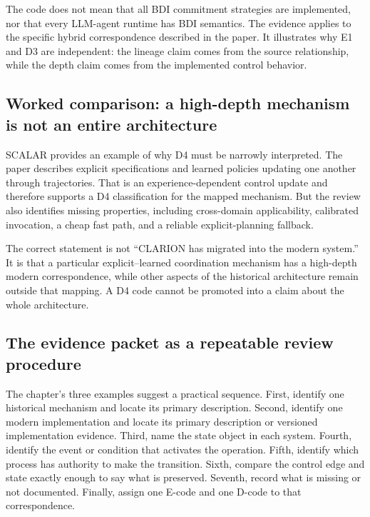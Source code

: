 The code does not mean that all BDI commitment strategies are implemented, nor that every LLM-agent runtime has BDI semantics. The evidence applies to the specific hybrid correspondence described in the paper. It illustrates why E1 and D3 are independent: the lineage claim comes from the source relationship, while the depth claim comes from the implemented control behavior.

\subsection{Worked comparison: a high-depth mechanism is not an entire architecture}

SCALAR provides an example of why D4 must be narrowly interpreted. The paper describes explicit specifications and learned policies updating one another through trajectories. That is an experience-dependent control update and therefore supports a D4 classification for the mapped mechanism. But the review also identifies missing properties, including cross-domain applicability, calibrated invocation, a cheap fast path, and a reliable explicit-planning fallback.

The correct statement is not ``CLARION has migrated into the modern system.'' It is that a particular explicit--learned coordination mechanism has a high-depth modern correspondence, while other aspects of the historical architecture remain outside that mapping. A D4 code cannot be promoted into a claim about the whole architecture.

\subsection{The evidence packet as a repeatable review procedure}

The chapter's three examples suggest a practical sequence. First, identify one historical mechanism and locate its primary description. Second, identify one modern implementation and locate its primary description or versioned implementation evidence. Third, name the state object in each system. Fourth, identify the event or condition that activates the operation. Fifth, identify which process has authority to make the transition. Sixth, compare the control edge and state exactly enough to say what is preserved. Seventh, record what is missing or not documented. Finally, assign one E-code and one D-code to that correspondence.

